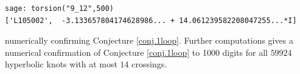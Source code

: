\documentclass[12pt]{amsart}
\theoremstyle{definition}
\numberwithin{equation}{section}
\begin{document}
\begin{verbatim}
sage: torsion("9_12",500)
['L105002',  -3.133657804174628986... + 14.061239582208047255...*I]
\end{verbatim}
numerically confirming Conjecture \ref{conj.1loop}.
Further computations gives a numerical confirmation
of Conjecture \ref{conj.1loop} to 1000 digits for all $59924$ hyperbolic 
knots with at most $14$ crossings.


















\end{document}
